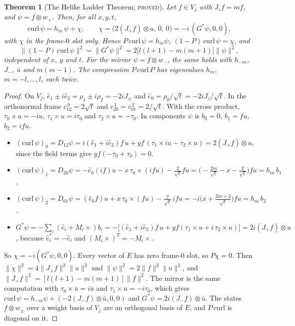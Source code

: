\documentclass[11pt]{article}
\newtheorem{theorem}{Theorem}[section]
\theoremstyle{definition}
\theoremstyle{remark}
\newcommand{\norm}[1]{\lVert #1\rVert}
\newcommand{\PROVED}{\textsc{proved}}
\begin{document}
\begin{theorem}[The Helike Ladder Theorem; \PROVED]\label{thm:ladder}
Let $f\in V_j$ with $J_zf=mf$, and $\psi=f\otimes w_+$. Then, for all $x,y,t$,
\[
  \mathrm{curl}\,\psi=h_m\,\psi+\chi,\qquad \chi=\bigl(2(J_+f)\otimes u,\,0,\,0\bigr)=-i\,(G^*\psi,0,0),
\]
with $\chi$ in the frame-$0$ slot only. Hence $P\,\mathrm{curl}\,\psi=h_m\psi$, $(1-P)\,\mathrm{curl}\,\psi=\chi$, and
\[
  \norm{(1-P)\,\mathrm{curl}\,\psi}^2=\norm{G^*\psi}^2=2\bigl[l(l+1)-m(m+1)\bigr]\norm\psi^2 ,
\]
independent of $x$, $y$ and $t$. For the mirror $\psi=f\otimes w_-$, the same holds with $h_{-m}$, $J_-$, $\bar u$ and
$m(m-1)$. The compression $P\,\mathrm{curl}\,P$ has eigenvalues $h_m$, $m=-l,\dots,l$, each twice.
\end{theorem}
\begin{proof}
On $V_j$, $\hat e_1\pm i\hat e_2=\rho_1\pm i\rho_2=-2iJ_\pm$ and $\hat e_0=\rho_0/\sqrt t=-2iJ_z/\sqrt t$. In the
orthonormal frame $c_{12}^{\,0}=2\sqrt t$ and $c_{20}^{\,1}=c_{01}^{\,2}=2/\sqrt t$. With the cross product,
$\tau_0\times u=-iu$, $\tau_1\times u=i\tau_0$ and $\tau_2\times u=-\tau_0$. In components $\psi$ is $b_0=0$, $b_1=fu$,
$b_2=ifu$.
\begin{itemize}
  \item $(\mathrm{curl}\,\psi)_0=D_{12}\psi=i(\hat e_1+i\hat e_2)f\,u+yf\,(\tau_1\times iu-\tau_2\times u)=2(J_+f)\otimes u$,
    since the field terms give $yf(-\tau_0+\tau_0)=0$.
  \item $(\mathrm{curl}\,\psi)_1=D_{20}\psi=-\hat e_0(if)u-x\,\tau_0\times(ifu)-\tfrac2{\sqrt t}fu
    =\bigl(-\tfrac{2m}{\sqrt t}-x-\tfrac2{\sqrt t}\bigr)fu=h_m\,b_1$.
  \item $(\mathrm{curl}\,\psi)_2=D_{01}\psi=(\hat e_0f)u+x\,\tau_0\times(fu)-\tfrac2{\sqrt t}\,ifu
    =-i\bigl(x+\tfrac{2m+2}{\sqrt t}\bigr)fu=h_m\,b_2$.
  \item $G^*\psi=-\sum_i(\hat e_i+M_i\times)b_i=-\bigl[(\hat e_1+i\hat e_2)f\,u+yf(\tau_1\times u+i\,\tau_2\times u)\bigr]
    =2i(J_+f)\otimes u$, because $\hat e_i^*=-\hat e_i$ and $(M_i\times)^T=-M_i\times$.
\end{itemize}
So $\chi=-i(G^*\psi,0,0)$. Every vector of $E$ has zero frame-$0$ slot, so $P\chi=0$. Then
$\norm\chi^2=4\norm{J_+f}^2\norm u^2$ and $\norm\psi^2=2\norm f^2\norm u^2$, and $\norm{J_+f}^2=[l(l+1)-m(m+1)]\norm f^2$.
The mirror is the same computation with $\tau_0\times\bar u=i\bar u$ and $\tau_1\times\bar u=-i\tau_0$, which gives
$\mathrm{curl}\,\psi=h_{-m}\psi+(-2(J_-f)\otimes\bar u,0,0)$ and $G^*\psi=2i(J_-f)\otimes\bar u$. The states $f\otimes w_\pm$
over a weight basis of $V_j$ are an orthogonal basis of $E$, and $P\,\mathrm{curl}$ is diagonal on it.
\end{proof}
\end{document}
